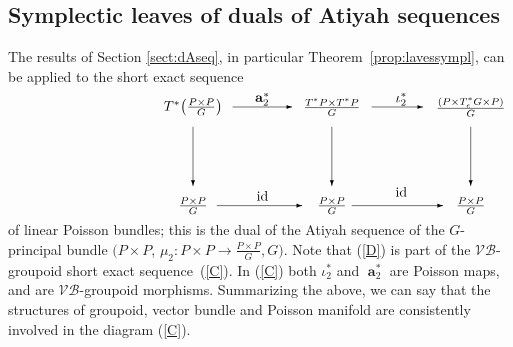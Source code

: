 \documentclass[pdftex]{sigma}
\renewcommand{\to}{\rightarrow}
\DeclareMathOperator{\anch}{\mathbf{a}}
\newcommand{\id}{\text{\upshape id}}
\numberwithin{equation}{section}
\begin{document}
\subsection{Symplectic leaves of duals of Atiyah sequences}\label{sec:sympleaves}

The results of Section \ref{sect:dAseq}, in particular Theorem~\ref{prop:lavessympl},
can be applied to the short exact sequence
 \begin{gather}\label{D}\begin{split}& \unitlength=5mm\begin{picture}(11,5.6)(-4.5,0)
 \put(-2,5){\makebox(0,0){$T^*\big(\frac{P\times P}{G}\big)$}}
 \put(5,5){\makebox(0,0){$\frac{T^*P\times T ^*P}{G}$}}
 \put(12,5){\makebox(0,0){$\frac{(P\times T^*_e G\times P)}{G}$}}
 \put(-2,0){\makebox(0,0){$\frac{P\times P}{G}$}}
 \put(5,0){\makebox(0,0){$\frac{P\times P}{G}$}}
 \put(12,0){\makebox(0,0){$\frac{P\times P}{G}$}}
 \put(5,4){\vector(0,-1){3}}
 \put(-2,4){\vector(0,-1){3}}
 \put(12,4){\vector(0,-1){3}}
 \put(7,5){\vector(1,0){2.6}}
 \put(6,0){\vector(1,0){4.6}}
 \put(-0.8,0){\vector(1,0){4.3}}
 \put(0,5){\vector(1,0){3}}
 \put(8.5,5.4){\makebox(0,0){$\iota_2^* $}}
 \put(8.5,0.7){\makebox(0,0){$\id$}}
\put(1.5,0.5){\makebox(0,0){$\id $}}
\put(1.5,5.4){\makebox(0,0){$\anch_2^* $}}
 \end{picture}\end{split}\end{gather}
of linear Poisson bundles; this is the dual of the Atiyah sequence of the $G$-principal bundle $(P\times P$, $\mu_2\colon P\times P\to \frac{P\times P}{G}, G)$. Note that (\ref{D}) is part of the $\mathcal{V}\!\mathcal{B}$-groupoid short exact sequence~(\ref{C}). In (\ref{C}) both $\iota_2^*$ and $\anch_2^*$ are Poisson maps, and are $\mathcal{V}\!\mathcal{B}$-groupoid morphisms. Summarizing the above, we can say that the structures of groupoid, vector bundle and Poisson manifold are consistently involved in the diagram (\ref{C}).
\end{document}
